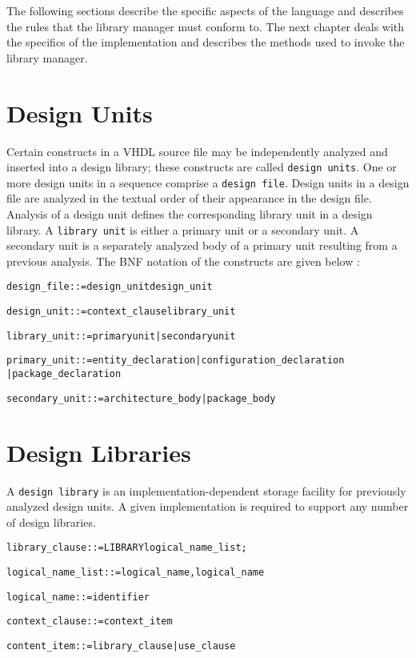 \documentclass[11pt]{report}
\begin{document}
The following sections describe the specific aspects of the language and
describes the rules that the library manager must conform to.  The next
chapter deals with the specifics of the implementation and describes the
methods used to invoke the library manager.

\section{Design Units}

Certain constructs in a VHDL source file may be independently analyzed and
inserted into a design library; these constructs are called \texttt{design
units}.  One or more design units in a sequence comprise a \texttt{design
file}.  Design units in a design file are analyzed in the textual order of
their appearance in the design file.  Analysis of a design unit defines
the corresponding library unit in a design library.  A \texttt{library
unit} is either a primary unit or a secondary unit.  A secondary unit is a
separately analyzed body of a primary unit resulting from a previous
analysis.  The BNF notation of the constructs are given below :
 
\begin{alltt}
design\_file ::= design\_unit { design\_unit }

design\_unit ::= context\_clause library\_unit

library\_unit ::= primary unit | secondary unit

primary\_unit ::= entity\_declaration | configuration\_declaration 
                                    | package\_declaration 

secondary\_unit ::= architecture\_body | package\_body
\end{alltt}

\section{Design Libraries}

A \texttt{design library} is an implementation-dependent storage facility
for previously analyzed design units.  A given implementation is required
to support any number of design libraries.

\begin{alltt}
library\_clause ::= LIBRARY logical\_name\_list;

logical\_name\_list ::= logical\_name {, logical\_name}

logical\_name ::= identifier

context\_clause ::= { context\_item }

content\_item ::= library\_clause | use\_clause
\end{alltt}
\end{document}
